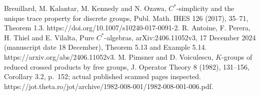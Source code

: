 \documentclass[10pt]{article}
\begin{document}
Breuillard, M. Kalantar, M. Kennedy and N. Ozawa, \(C^*\)-simplicity and the unique trace property for discrete groups, Publ. Math. IHES 126 (2017), 35–71, Theorem 1.3. https://doi.org/10.1007/s10240-017-0091-2. R. Antoine, F. Perera, H. Thiel and E. Vilalta, Pure \(C^*\)-algebras, arXiv:2406.11052v3, 17 December 2024 (manuscript date 18 December), Theorem 5.13 and Example 5.14. https://arxiv.org/abs/2406.11052v3. M. Pimsner and D. Voiculescu, \(K\)-groups of reduced crossed products by free groups, J. Operator Theory 8 (1982), 131–156, Corollary 3.2, p. 152; actual published scanned pages inspected. https://jot.theta.ro/jot/archive/1982-008-001/1982-008-001-006.pdf.\par
\end{document}
